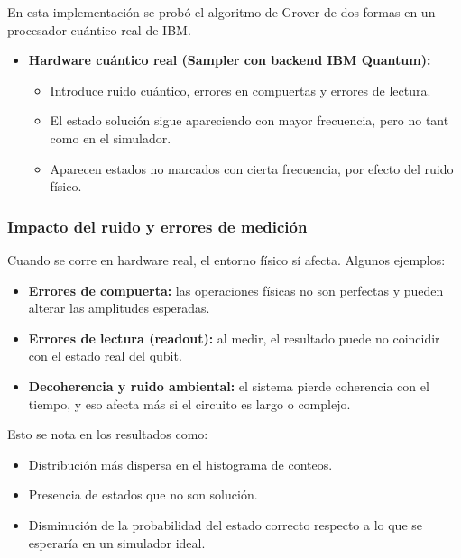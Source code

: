 \documentclass{article}
\begin{document}
En esta implementación se probó el algoritmo de Grover de dos formas en un 
procesador cuántico real de IBM.

\begin{itemize}
    \item \textbf{Hardware cuántico real (Sampler con backend IBM Quantum):}
    \begin{itemize}
        \item Introduce ruido cuántico, errores en compuertas y errores de lectura.
        \item El estado solución sigue apareciendo con mayor frecuencia, 
                pero no tant como en el simulador.
        \item Aparecen estados no marcados con cierta frecuencia, 
                por efecto del ruido físico.
    \end{itemize}
\end{itemize}

\subsubsection*{Impacto del ruido y errores de medición}

Cuando se corre en hardware real, el entorno físico sí afecta. Algunos ejemplos:

\begin{itemize}
    \item \textbf{Errores de compuerta:} las operaciones físicas no son perfectas y 
            pueden alterar las amplitudes esperadas.
    \item \textbf{Errores de lectura (readout):} al medir, el resultado puede no 
            coincidir con el estado real del qubit.
    \item \textbf{Decoherencia y ruido ambiental:} el sistema pierde coherencia con 
            el tiempo, y eso afecta más si el circuito es largo o complejo.
\end{itemize}

Esto se nota en los resultados como:

\begin{itemize}
    \item Distribución más dispersa en el histograma de conteos.
    \item Presencia de estados que no son solución.
    \item Disminución de la probabilidad del estado 
            correcto respecto a lo que se esperaría en un simulador ideal.
\end{itemize}
\end{document}
